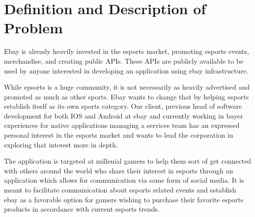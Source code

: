 \documentclass[onecolumn, draftclsnofoot,10pt, compsoc]{IEEEtran}
\begin{document}
\newpage
{}
\tableofcontents
\clearpage

\section{Definition and Description of Problem}
\par Ebay is already heavily invested in the esports market, promoting esports events, merchandise, and creating public APIs. These APIs are publicly available to be used by anyone interested in developing an application using ebay infrastructure.
\par While epsorts is a huge community, it is not necessarily as heavily advertised and promoted as much as other sports. Ebay wants to change that by helping esports establish itself as its own sports category. Our client, previous head of software development for both IOS and Android at ebay and currently working in buyer experiences for native applications managing a services team has an expressed personal interest in the esports market and wants to lead the corporation in exploring that interest more in depth.
\par The application is targeted at millenial gamers to help them sort of get connected with  others around the world who share their interest in esports through an application which allows for communication via some form of social media. It is meant to facilitate communication about esports related  events and establish ebay as a favorable option for gamers wishing to purchase their favorite esports products in accordance with current esports trends.
\end{document}
